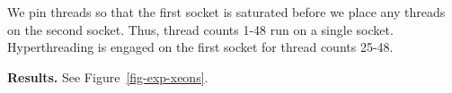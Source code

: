We pin threads so that the first socket is saturated before we place any threads on the second socket.
Thus, thread counts 1-48 run on a single socket.
Hyperthreading is engaged on the first socket for thread counts 25-48.


\vspace{1mm}\noindent\textbf{Results.}
See Figure~\ref{fig-exp-xeons}.